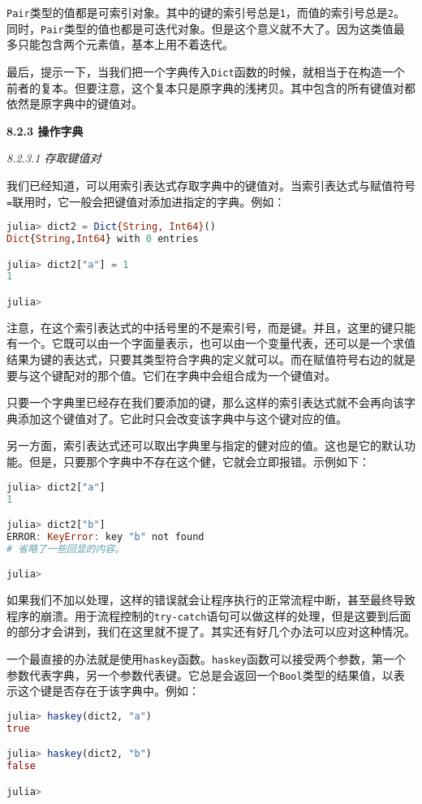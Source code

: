 \verb|Pair|类型的值都是可索引对象。其中的键的索引号总是\verb|1|，而值的索引号总是\verb|2|。同时，\verb|Pair|类型的值也都是可迭代对象。但是这个意义就不大了。因为这类值最多只能包含两个元素值，基本上用不着迭代。

最后，提示一下，当我们把一个字典传入\verb|Dict|函数的时候，就相当于在构造一个前者的复本。但要注意，这个复本只是原字典的浅拷贝。其中包含的所有键值对都依然是原字典中的键值对。

\textbf{8.2.3 操作字典}

\textsl{8.2.3.1 存取键值对}

我们已经知道，可以用索引表达式存取字典中的键值对。当索引表达式与赋值符号\verb|=|联用时，它一般会把键值对添加进指定的字典。例如：
\begin{lstlisting}[language=julia]
julia> dict2 = Dict{String, Int64}()
Dict{String,Int64} with 0 entries

julia> dict2["a"] = 1
1

julia> 
\end{lstlisting}

注意，在这个索引表达式的中括号里的不是索引号，而是键。并且，这里的键只能有一个。它既可以由一个字面量表示，也可以由一个变量代表，还可以是一个求值结果为键的表达式，只要其类型符合字典的定义就可以。而在赋值符号右边的就是要与这个键配对的那个值。它们在字典中会组合成为一个键值对。

只要一个字典里已经存在我们要添加的键，那么这样的索引表达式就不会再向该字典添加这个键值对了。它此时只会改变该字典中与这个键对应的值。

另一方面，索引表达式还可以取出字典里与指定的健对应的值。这也是它的默认功能。但是，只要那个字典中不存在这个健，它就会立即报错。示例如下：
\begin{lstlisting}[language=julia]
julia> dict2["a"]
1

julia> dict2["b"]
ERROR: KeyError: key "b" not found
# 省略了一些回显的内容。

julia> 
\end{lstlisting}

如果我们不加以处理，这样的错误就会让程序执行的正常流程中断，甚至最终导致程序的崩溃。用于流程控制的\verb|try-catch|语句可以做这样的处理，但是这要到后面的部分才会讲到，我们在这里就不提了。其实还有好几个办法可以应对这种情况。

一个最直接的办法就是使用\verb|haskey|函数。\verb|haskey|函数可以接受两个参数，第一个参数代表字典，另一个参数代表键。它总是会返回一个\verb|Bool|类型的结果值，以表示这个键是否存在于该字典中。例如：
\begin{lstlisting}[language=julia]
julia> haskey(dict2, "a")
true

julia> haskey(dict2, "b")
false

julia>
\end{lstlisting}


